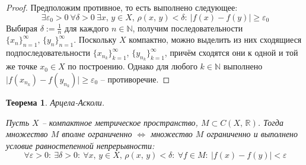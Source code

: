 \documentclass[a4paper,12pt]{article}
\renewcommand{\geq}{\ensuremath{\geqslant}}
\theoremstyle{plain}
\newtheorem{theorem}{Теорема}[section]
\theoremstyle{definition}
\theoremstyle{remark}
\begin{document}
\begin{proof}
	Предположим противное, то есть выполнено следующее:
	\[
		\exists \varepsilon_0 > 0 \: \forall \delta > 0 \: \exists x,\,y \in X,\, \rho(x,\, y) < \delta :\: \vert f(x) - f(y)\vert \geq \varepsilon_0
	\]
	Выбирая $\delta := \frac{1}{n}$ для каждого $n \in \mathbb{N}$, получим последовательности $\{x_n\}_{n=1}^\infty,\, \{y_n\}_{n=1}^\infty$. Поскольку $X$ компактно, можно выделить из них сходящиеся подпоследовательности $\{x_{n_k}\}_{k=1}^\infty$, $\{y_{n_k}\}_{k=1}^\infty$, причём сходятся они к одной и той же точке $x_0 \in X$ по построению. Однако для любого $k \in \mathbb{N}$ выполнено $\vert f(x_{n_k}) - f(y_{n_k})\vert \geq \varepsilon_0$ -- противоречие.
\end{proof}

\begin{theorem}
	Арцела-Асколи.

	Пусть $X$ -- компактное метрическое пространство, $M \subset C(X,\, \mathbb{R})$. Тогда множество $M$ вполне ограниченно $\Leftrightarrow$ множество $M$ ограниченно и выполнено условие равностепенной непрерывности:
	\[
		\forall \varepsilon > 0 :\: \exists \delta > 0 :\: \forall x,\, y \in X,\, \rho(x,\, y) < \delta :\: \forall f \in M :\: \vert f(x) - f(y)\vert < \varepsilon
	\]
\end{theorem}
\end{document}

